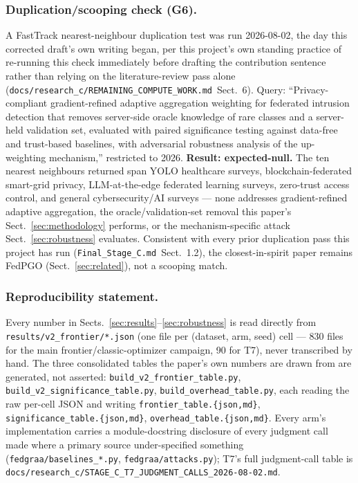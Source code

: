 \documentclass{llncs}
\begin{document}
\subsubsection{Duplication/scooping check (G6).}
A FastTrack nearest-neighbour duplication test was run 2026-08-02, the day this corrected draft's own writing began, per this project's own standing practice of re-running this check immediately before drafting the contribution sentence rather than relying on the literature-review pass alone (\texttt{docs/research\_c/REMAINING\_COMPUTE\_WORK.md}~Sect.~6). Query: ``Privacy-compliant gradient-refined adaptive aggregation weighting for federated intrusion detection that removes server-side oracle knowledge of rare classes and a server-held validation set, evaluated with paired significance testing against data-free and trust-based baselines, with adversarial robustness analysis of the up-weighting mechanism,'' restricted to 2026. \textbf{Result: expected-null.} The ten nearest neighbours returned span YOLO healthcare surveys, blockchain-federated smart-grid privacy, LLM-at-the-edge federated learning surveys, zero-trust access control, and general cybersecurity/AI surveys --- none addresses gradient-refined adaptive aggregation, the oracle/validation-set removal this paper's Sect.~\ref{sec:methodology} performs, or the mechanism-specific attack Sect.~\ref{sec:robustness} evaluates. Consistent with every prior duplication pass this project has run (\texttt{Final\_Stage\_C.md}~Sect.~1.2), the closest-in-spirit paper remains FedPGO (Sect.~\ref{sec:related}), not a scooping match.

\subsubsection{Reproducibility statement.}
Every number in Sects.~\ref{sec:results}--\ref{sec:robustness} is read directly from \texttt{results/v2\_frontier/*.json} (one file per (dataset, arm, seed) cell --- 830 files for the main frontier/classic-optimizer campaign, 90 for T7), never transcribed by hand. The three consolidated tables the paper's own numbers are drawn from are generated, not asserted: \texttt{build\_v2\_frontier\_table.py}, \texttt{build\_v2\_significance\_table.py}, \texttt{build\_overhead\_table.py}, each reading the raw per-cell JSON and writing \texttt{frontier\_table.\{json,md\}}, \texttt{significance\_table.\{json,md\}}, \texttt{overhead\_table.\{json,md\}}. Every arm's implementation carries a module-docstring disclosure of every judgment call made where a primary source under-specified something (\texttt{fedgraa/baselines\_*.py}, \texttt{fedgraa/attacks.py}); T7's full judgment-call table is \texttt{docs/research\_c/STAGE\_C\_T7\_JUDGMENT\_CALLS\_2026-08-02.md}.
\end{document}
